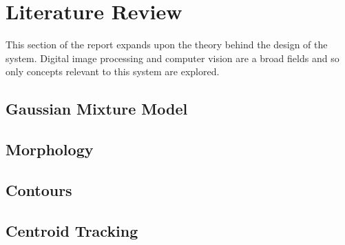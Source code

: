 \chapter{Literature Review}
This section of the report expands upon the theory behind the design of the system. Digital image processing and computer vision are a broad fields and so only concepts relevant to this system are explored.





\section{Gaussian Mixture Model}


\section{Morphology}

\section{Contours}

\section{Centroid Tracking}